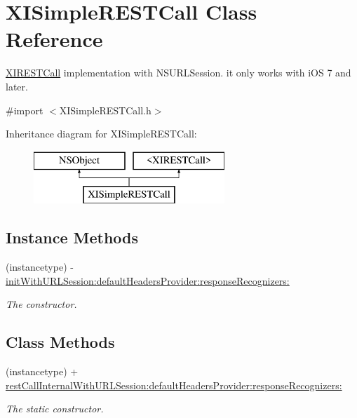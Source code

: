 \hypertarget{interface_x_i_simple_r_e_s_t_call}{}\section{X\+I\+Simple\+R\+E\+S\+T\+Call Class Reference}
\label{interface_x_i_simple_r_e_s_t_call}


\hyperlink{class_x_i_r_e_s_t_call-p}{X\+I\+R\+E\+S\+T\+Call} implementation with N\+S\+U\+R\+L\+Session. it only works with i\+OS 7 and later.  




{\ttfamily \#import $<$X\+I\+Simple\+R\+E\+S\+T\+Call.\+h$>$}

Inheritance diagram for X\+I\+Simple\+R\+E\+S\+T\+Call\+:\begin{figure}[H]
\begin{center}
\leavevmode
\includegraphics[height=2.000000cm]{interface_x_i_simple_r_e_s_t_call}
\end{center}
\end{figure}
\subsection*{Instance Methods}
\begin{DoxyCompactItemize}
\item 
(instancetype) -\/ \hyperlink{interface_x_i_simple_r_e_s_t_call_ab6b30d86ec930f88b747d702cc1190a5}{init\+With\+U\+R\+L\+Session\+:default\+Headers\+Provider\+:response\+Recognizers\+:}
\begin{DoxyCompactList}\small\item\em The constructor. \end{DoxyCompactList}\end{DoxyCompactItemize}
\subsection*{Class Methods}
\begin{DoxyCompactItemize}
\item 
(instancetype) + \hyperlink{interface_x_i_simple_r_e_s_t_call_af0fc13a5b2a19327b80e2371099060d8}{rest\+Call\+Internal\+With\+U\+R\+L\+Session\+:default\+Headers\+Provider\+:response\+Recognizers\+:}
\begin{DoxyCompactList}\small\item\em The static constructor. \end{DoxyCompactList}\end{DoxyCompactItemize}


